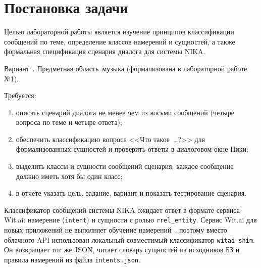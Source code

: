 \section{Постановка задачи}
\label{sec:task}

Целью лабораторной работы является изучение принципов классификации сообщений по теме, определение классов намерений и сущностей, а также формальная спецификация сценария диалога для системы NIKA.

Вариант~. Предметная область~\mdash  музыка (формализована в лабораторной работе №1).

Требуется:
\begin{enumerate}
	\item описать сценарий диалога не менее чем из восьми сообщений (четыре вопроса по теме и четыре ответа);
	\item обеспечить классификацию вопроса <<Что такое~\ldots?>> для формализованных сущностей и проверить ответы в диалоговом окне Ники;
	\item выделить классы и сущности сообщений сценария; каждое сообщение должно иметь хотя бы один класс;
	\item в отчёте указать цель, задание, вариант и показать тестирование сценария.
\end{enumerate}

Классификатор сообщений системы NIKA ожидает ответ в формате сервиса Wit.ai: намерение (\texttt{intent}) и сущности с ролью \texttt{rrel\_entity}. Сервис Wit.ai для новых приложений не выполняет обучение намерений~\cite{wit2851}, поэтому вместо облачного API использован локальный совместимый классификатор \texttt{witai-shim}. Он возвращает тот же JSON, читает словарь сущностей из исходников БЗ и правила намерений из файла \texttt{intents.json}.
